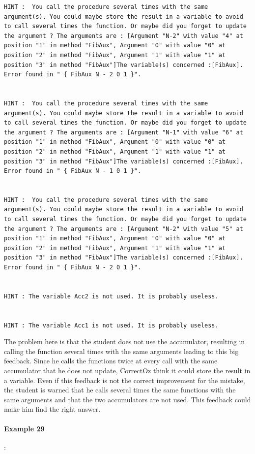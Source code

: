 \documentclass[11pt,a4paper,twoside,openright]{report}
\begin{document}
\begin{lstlisting}
HINT :  You call the procedure several times with the same argument(s). You could maybe store the result in a variable to avoid to call several times the function. Or maybe did you forget to update the argument ? The arguments are : [Argument "N-2" with value "4" at position "1" in method "FibAux", Argument "0" with value "0" at position "2" in method "FibAux", Argument "1" with value "1" at position "3" in method "FibAux"]The variable(s) concerned :[FibAux]. Error found in " { FibAux N - 2 0 1 }".


HINT :  You call the procedure several times with the same argument(s). You could maybe store the result in a variable to avoid to call several times the function. Or maybe did you forget to update the argument ? The arguments are : [Argument "N-1" with value "6" at position "1" in method "FibAux", Argument "0" with value "0" at position "2" in method "FibAux", Argument "1" with value "1" at position "3" in method "FibAux"]The variable(s) concerned :[FibAux]. Error found in " { FibAux N - 1 0 1 }".


HINT :  You call the procedure several times with the same argument(s). You could maybe store the result in a variable to avoid to call several times the function. Or maybe did you forget to update the argument ? The arguments are : [Argument "N-2" with value "5" at position "1" in method "FibAux", Argument "0" with value "0" at position "2" in method "FibAux", Argument "1" with value "1" at position "3" in method "FibAux"]The variable(s) concerned :[FibAux]. Error found in " { FibAux N - 2 0 1 }".


HINT : The variable Acc2 is not used. It is probably useless.


HINT : The variable Acc1 is not used. It is probably useless.

\end{lstlisting}

The problem here is that the student does not use the accumulator, resulting in 
calling the function several times with the same arguments leading to this big 
feedback. Since he calls the functions twice at every call with the same 
accumulator that he does not update, CorrectOz think it could store the result 
in a variable. Even if this feedback is not the correct improvement for the 
mistake, the student is warned that he calls several times the same functions 
with the same arguments and that the two accumulators are not used. This 
feedback could make him find the right answer.


\newpage
\paragraph{Example 29}:
\end{document}
